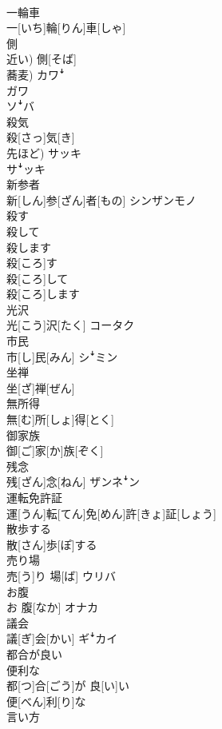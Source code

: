 \documentclass[8pt]{extreport}
\begin{document}
\begin{CJK}{UTF8}{min}
\\	一輪車	
\\	一[いち]輪[りん]車[しゃ]
\\	側	
\\	近い)	側[そば] 
\\	蕎麦)	カワꜜ 
\\	ガワ 
\\	ソꜜバ
\\	殺気	
\\	殺[さっ]気[き] 
\\	先ほど)	サッキ 
\\	サꜜッキ
\\	新参者	
\\	新[しん]参[ざん]者[もの]	シンザンモノ
\\	殺す 
\\	殺して 
\\	殺します	
\\	殺[ころ]す 
\\	殺[ころ]して 
\\	殺[ころ]します	
\\	光沢	
\\	光[こう]沢[たく]	コータク
\\	市民	
\\	市[し]民[みん]	シꜜミン
\\	坐禅	
\\	坐[ざ]禅[ぜん]	
\\	無所得	
\\	無[む]所[しょ]得[とく]	
\\	御家族	
\\	御[ご]家[か]族[ぞく]	
\\	残念	
\\	残[ざん]念[ねん]	ザンネꜜン
\\	運転免許証	
\\	運[うん]転[てん]免[めん]許[きょ]証[しょう]	
\\	散歩する	
\\	散[さん]歩[ぽ]する	
\\	売り場	
\\	売[う]り 場[ば]	ウリバ
\\	お腹	
\\	お 腹[なか]	オナカ
\\	議会	
\\	議[ぎ]会[かい]	ギꜜカイ
\\	都合が良い 
\\	便利な	
\\	都[つ]合[ごう]が 良[い]い 
\\	便[べん]利[り]な
\\	言い方	

\end{CJK}
\end{document}
